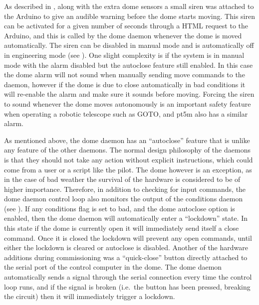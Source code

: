 \begin{colsection}
As described in , along with the extra dome sensors a small siren was attached to the Arduino to give an audible warning before the dome starts moving. This siren can be activated for a given number of seconds through a HTML request to the Arduino, and this is called by the dome daemon whenever the dome is moved automatically. The siren can be disabled in manual mode and is automatically off in engineering mode (see ). One slight complexity is if the system is in manual mode with the alarm disabled but the autoclose feature still enabled. In this case the dome alarm will not sound when manually sending move commands to the daemon, however if the dome is due to close automatically in bad conditions it will re-enable the alarm and make sure it sounds before moving. Forcing the siren to sound whenever the dome moves autonomously is an important safety feature when operating a robotic telescope such as GOTO, and pt5m also has a similar alarm.

As mentioned above, the dome daemon has an ``autoclose'' feature that is unlike any feature of the other daemons. The normal design philosophy of the daemons is that they should not take any action without explicit instructions, which could come from a user or a script like the pilot. The dome however is an exception, as in the case of bad weather the survival of the hardware is considered to be of higher importance. Therefore, in addition to checking for input commands, the dome daemon control loop also monitors the output of the conditions daemon (see ). If any conditions flag is set to bad, and the dome autoclose option is enabled, then the dome daemon will automatically enter a ``lockdown'' state. In this state if the dome is currently open it will immediately send itself a close command. Once it is closed the lockdown will prevent any open commands, until either the lockdown is cleared or autoclose is disabled. Another of the hardware additions during commissioning was a ``quick-close'' button directly attached to the serial port of the control computer in the dome. The dome daemon automatically sends a signal through the serial connection every time the control loop runs, and if the signal is broken (i.e.\ the button has been pressed, breaking the circuit) then it will immediately trigger a lockdown.


\end{colsection}
